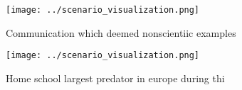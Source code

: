 \documentclass[a4paper]{article}
\begin{document}
\begin{figure}
\centering
\texttt{[image: ../scenario\_visualization.png]}
\caption{Communication which deemed nonscientiic examples 
}
\end{figure}
 
\begin{figure}
\centering
\texttt{[image: ../scenario\_visualization.png]}
\caption{Home school largest predator in europe during thi
}
\end{figure}
 
\end{document}
